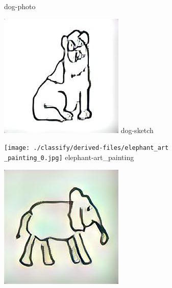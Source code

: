 \documentclass{article}
\begin{document}
\begin{figure}[htp]
\begin{minipage}{0.14285714285714285\linewidth}
        {dog-photo}
    \end{minipage}%
    \begin{minipage}{0.14285714285714285\linewidth}
        \includegraphics[width=\linewidth]{./classify/derived-files/dog_sketch_0.jpg}
        {dog-sketch}
    \end{minipage}%
    \begin{minipage}{0.14285714285714285\linewidth}
        \texttt{[image: ./classify/derived-files/elephant\_art\\\_painting\_0.jpg]}
        {elephant-art\_painting}
    \end{minipage}%
    \begin{minipage}{0.14285714285714285\linewidth}
        \includegraphics[width=\linewidth]{./classify/derived-files/elephant_cartoon_0.jpg}

\end{minipage}
\end{figure}
\end{document}
